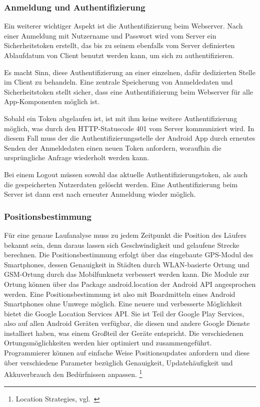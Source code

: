 \subsubsection{Anmeldung und Authentifizierung}
Ein weiterer wichtiger Aspekt ist die Authentifizierung beim Webserver. Nach einer Anmeldung mit Nutzername und Passwort wird vom Server ein Sicherheitstoken erstellt, das bis zu seinem ebenfalls vom Server definierten Ablaufdatum von Client benutzt werden kann, um sich zu authentifizieren.

Es macht Sinn, diese Authentifizierung an einer einzelnen, dafür dedizierten Stelle im Client zu behandeln. Eine zentrale Speicherung von Anmeldedaten und Sicherheitstoken stellt sicher, dass eine Authentifizierung beim Webserver für alle App-Komponenten möglich ist.

Sobald ein Token abgelaufen ist, ist mit ihm keine weitere Authentifizierung möglich, was durch den HTTP-Statuscode 401 vom Server kommuniziert wird. In diesem Fall muss der die Authentifizierungsstelle der Android App durch erneutes Senden der Anmeldedaten einen neuen Token anfordern, woraufhin die ursprüngliche Anfrage wiederholt werden kann.

Bei einem Logout müssen sowohl das aktuelle Authentifizierungstoken, als auch die gespeicherten Nutzerdaten gelöscht werden. Eine Authentifizierung beim Server ist dann erst nach erneuter Anmeldung wieder möglich.
\subsubsection{Positionsbestimmung}
Für eine genaue Laufanalyse muss zu jedem Zeitpunkt die Position des Läufers bekannt sein, denn daraus lassen sich Geschwindigkeit und gelaufene Strecke berechnen. Die Positionsbestimmung erfolgt über das eingebaute GPS-Modul des Smartphones, dessen Genauigkeit in Städten durch WLAN-basierte Ortung und GSM-Ortung durch das Mobilfunknetz verbessert werden kann. Die Module zur Ortung können über das Package android.location der Android API angesprochen werden. Eine Positionsbestimmung ist also mit Boardmitteln eines Android Smartphones ohne Umwege möglich. Eine neuere und verbesserte Möglichkeit bietet die Google Location Services API. Sie ist Teil der Google Play Services, also auf allen Android Geräten verfügbar, die diesen und andere Google Dienste installiert haben, was einem Großteil der Geräte entspricht. Die verschiedenen Ortungsmöglichkeiten werden hier optimiert und zusammengeführt. Programmierer können auf einfache Weise Positionsupdates anfordern und diese über verschiedene Parameter bezüglich Genauigkeit, Updatehäufigkeit und Akkuverbrauch den Bedürfnissen anpassen. \footnote{Location Strategies, vgl.~\cite{androidlocation}}
